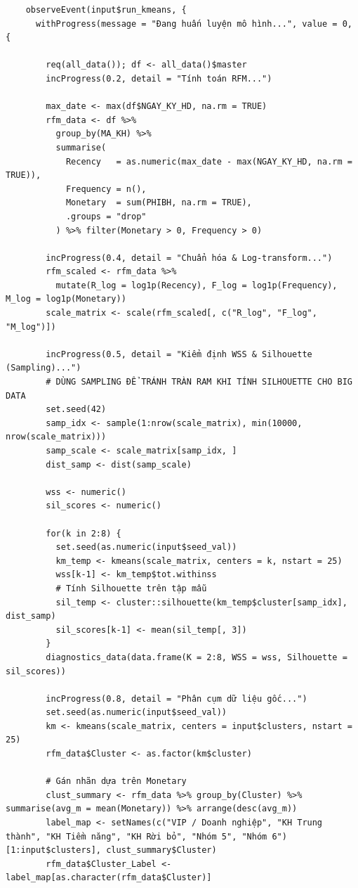\documentclass[12pt, a4paper]{article}
\begin{document}
\begin{lstlisting}
    observeEvent(input$run_kmeans, {
      withProgress(message = "Đang huấn luyện mô hình...", value = 0, {
        
        req(all_data()); df <- all_data()$master
        incProgress(0.2, detail = "Tính toán RFM...")
        
        max_date <- max(df$NGAY_KY_HD, na.rm = TRUE)
        rfm_data <- df %>%
          group_by(MA_KH) %>%
          summarise(
            Recency   = as.numeric(max_date - max(NGAY_KY_HD, na.rm = TRUE)),
            Frequency = n(),
            Monetary  = sum(PHIBH, na.rm = TRUE),
            .groups = "drop"
          ) %>% filter(Monetary > 0, Frequency > 0)
        
        incProgress(0.4, detail = "Chuẩn hóa & Log-transform...")
        rfm_scaled <- rfm_data %>%
          mutate(R_log = log1p(Recency), F_log = log1p(Frequency), M_log = log1p(Monetary))
        scale_matrix <- scale(rfm_scaled[, c("R_log", "F_log", "M_log")])
        
        incProgress(0.5, detail = "Kiểm định WSS & Silhouette (Sampling)...")
        # DÙNG SAMPLING ĐỂ TRÁNH TRÀN RAM KHI TÍNH SILHOUETTE CHO BIG DATA
        set.seed(42)
        samp_idx <- sample(1:nrow(scale_matrix), min(10000, nrow(scale_matrix)))
        samp_scale <- scale_matrix[samp_idx, ]
        dist_samp <- dist(samp_scale)
        
        wss <- numeric()
        sil_scores <- numeric()
        
        for(k in 2:8) {
          set.seed(as.numeric(input$seed_val))
          km_temp <- kmeans(scale_matrix, centers = k, nstart = 25)
          wss[k-1] <- km_temp$tot.withinss
          # Tính Silhouette trên tập mẫu
          sil_temp <- cluster::silhouette(km_temp$cluster[samp_idx], dist_samp)
          sil_scores[k-1] <- mean(sil_temp[, 3])
        }
        diagnostics_data(data.frame(K = 2:8, WSS = wss, Silhouette = sil_scores))
        
        incProgress(0.8, detail = "Phân cụm dữ liệu gốc...")
        set.seed(as.numeric(input$seed_val))
        km <- kmeans(scale_matrix, centers = input$clusters, nstart = 25)
        rfm_data$Cluster <- as.factor(km$cluster)
        
        # Gán nhãn dựa trên Monetary
        clust_summary <- rfm_data %>% group_by(Cluster) %>% summarise(avg_m = mean(Monetary)) %>% arrange(desc(avg_m))
        label_map <- setNames(c("VIP / Doanh nghiệp", "KH Trung thành", "KH Tiềm năng", "KH Rời bỏ", "Nhóm 5", "Nhóm 6")[1:input$clusters], clust_summary$Cluster)
        rfm_data$Cluster_Label <- label_map[as.character(rfm_data$Cluster)]
        

\end{lstlisting}
\end{document}
